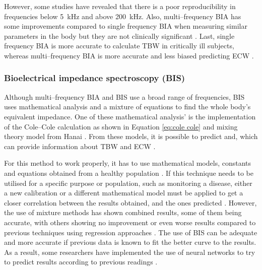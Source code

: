 However, some studies have revealed that there is a poor reproducibility in frequencies below \SI{5}{\kilo\hertz} and above \SI{200}{\kilo\hertz}. Also, multi–frequency BIA has some improvements compared to single frequency BIA when measuring similar parameters in the body but they are not clinically significant \cite{hannan1995comparison}. Last, single frequency BIA is more accurate to calculate TBW in critically ill subjects, whereas multi–frequency BIA is more accurate and less biased predicting ECW \cite{patel1996estimation}. 

\subsubsection{Bioelectrical impedance spectroscopy (BIS)}
Although multi–frequency BIA and BIS use a broad range of frequencies, BIS uses mathematical analysis and a mixture of equations to find the whole body’s equivalent impedance. One of these mathematical analysis’ is the implementation of the Cole–Cole \cite{cole1941dispersion} calculation as shown in Equation \ref{eq:cole cole} and mixing theory model from Hanai \cite{hanai1968electrical}. From these models, it is possible to predict and, which can provide information about TBW and ECW \cite{hanai1968electrical}. 

For this method to work properly, it has to use mathematical models, constants and equations obtained from a healthy population \cite{patel1994estimation}. If this technique needs to be utilised for a specific purpose or population, such as monitoring a disease, either a new calibration or a different mathematical model must be applied to get a closer correlation between the results obtained, and the ones predicted \cite{schoeller2000bioelectrical, de1997predicting}. However, the use of mixture methods has shown combined results, some of them being accurate, with others showing no improvement or even worse results compared to previous techniques using regression approaches \cite{kyle2004bioelectrical}. The use of BIS can be adequate and more accurate if previous data is known to fit the better curve to the results. As a result, some researchers have implemented the use of neural networks to try to predict results according to previous readings \cite{songer2001tissue,kun2003algorithm}. 

